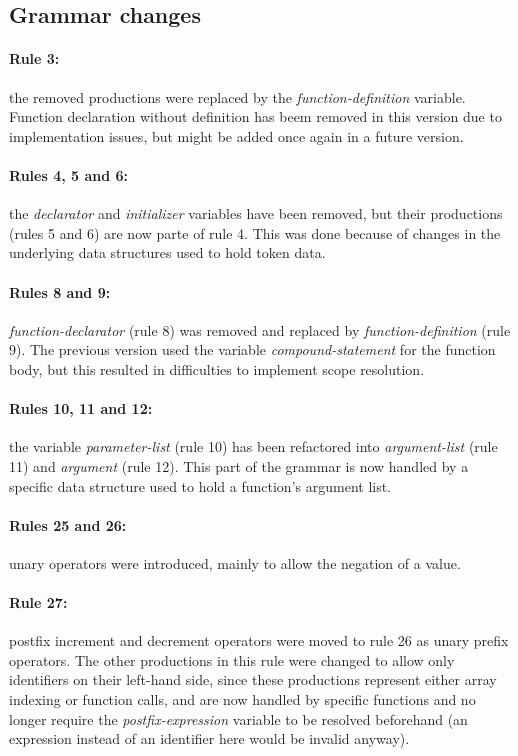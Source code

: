 \normalsize

\subsection{Grammar changes}
\paragraph{Rule 3:} the removed productions were replaced by the \textit{function-definition} variable.
Function declaration without definition has beem removed in this version due to implementation issues,
but might be added once again in a future version.

\paragraph{Rules 4, 5 and 6:} the \textit{declarator} and \textit{initializer} variables have been
removed, but their productions (rules 5 and 6) are now parte of rule 4. This was done because
of changes in the underlying data structures used to hold token data.

\paragraph{Rules 8 and 9:} \textit{function-declarator} (rule 8) was removed and replaced by
\textit{function-definition} (rule 9). The previous version used the variable
\textit{compound-statement} for the function body, but this resulted in difficulties
to implement scope resolution.

\paragraph{Rules 10, 11 and 12:} the variable \textit{parameter-list} (rule 10) has been
refactored into \textit{argument-list} (rule 11) and \textit{argument} (rule 12). This part of
the grammar is now handled by a specific data structure used to hold a function's argument list.

\paragraph{Rules 25 and 26:} unary operators were introduced, mainly to allow the negation
of a value.

\paragraph{Rule 27:} postfix increment and decrement operators were moved to rule 26 as unary prefix
operators. The other productions in this rule were changed to allow only identifiers on their left-hand
side, since these productions represent either array indexing or function calls, and are now handled
by specific functions and no longer require the \textit{postfix-expression} variable to be resolved
beforehand (an expression instead of an identifier here would be invalid anyway).

